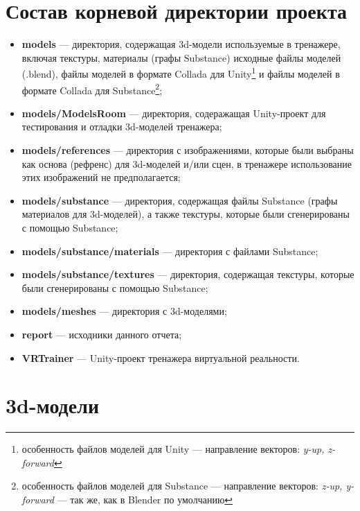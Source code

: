 

\usepackage{dirtree}




\section{Состав корневой директории проекта}


\begin{itemize}
	\item \textbf{models} --- директория, содержащая 3d-модели используемые в тренажере, включая текстуры, материалы (графы Substance) исходные файлы моделей (.blend), файлы моделей в формате Collada для Unity\footnote{особенность файлов моделей для Unity --- направление векторов: \textit{y-up, z-forward}} и файлы моделей в формате Collada для Substance\footnote{особенность файлов моделей для Substance --- направление векторов: \textit{z-up, y-forward} --- так же, как в Blender по умолчанию};
	\item \textbf{models/ModelsRoom} --- директория, содеражащая Unity-проект для тестирования и отладки 3d-моделей тренажера;
	\item \textbf{models/references} --- директория с изображениями, которые были выбраны как основа (рефренс) для 3d-моделей и/или сцен, в тренажере использование этих изображений не предполагается; 
	\item \textbf{models/substance} --- директория, содержащая файлы Substance (графы материалов для 3d-моделей), а также текстуры, которые были сгенерированы с помощью Substance;
	\item \textbf{models/substance/materials} --- директория с файлами Substance;
	\item \textbf{models/substance/textures} --- директория, содержащая текстуры, которые были сгенерированы с помощью Substance;
	\item \textbf{models/meshes} --- директория с 3d-моделями;
	\item \textbf{report} --- исходники данного отчета;
	\item \textbf{VRTrainer} --- Unity-проект тренажера виртуальной реальности.
\end{itemize}

\section{3d-модели}


